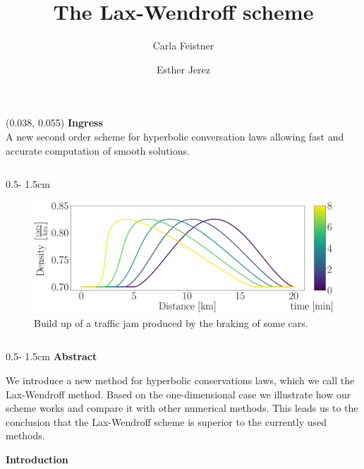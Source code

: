 \documentclass{uibposter}
\title{The Lax-Wendroff scheme}
\author
{%
    Carla Feistner 
    \and
    Esther Jerez
}
\institute
{
    Department of mathematics -- University of Bergen
}
\begin{document}
\begin{textblock}{0.5}(0.038, 0.055)
    \color{white}
    \sffamily
    \textbf{Ingress}
    \\
A new second order scheme for hyperbolic conversation laws allowing fast and accurate computation of smooth solutions. 
\end{textblock}

\begin{frame}[fragile]

\begin{columns}
\begin{column}{0.5\textwidth - 1.5cm}
    \begin{figure}[h]
    \includegraphics[width=\textwidth]{fig/traffic_motivation_laxW_continous.png} \caption{Build up of a traffic jam produced by the braking of some cars.} \label{img:traffic_flow_motivation}	
    \end{figure}
    \vspace{0.5cm}

\begin{column}{0.5\textwidth - 1.5cm}
\textbf{Abstract}
\vspace{0.5cm}

We introduce a new method for hyperbolic conservations laws, which we call the Lax-Wendroff method. Based on the one-dimensional case we illustrate how our scheme works and compare it with other numerical methods. This leads us to the conclusion that the Lax-Wendroff scheme is superior to the currently used methods.

\vspace{0.5cm}
\textbf{Introduction}
\vspace{0.5cm}


\end{column}
\end{column}
\end{columns}
\end{frame}
\end{document}
